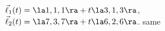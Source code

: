 {$\vec\ell_1(t) = \la 1,1,1\ra + t\la 3,1,3\ra$,\\
$\vec\ell_2(t) = \la 7,3,7\ra + t\la 6,2,6\ra$.
}
{same
}

